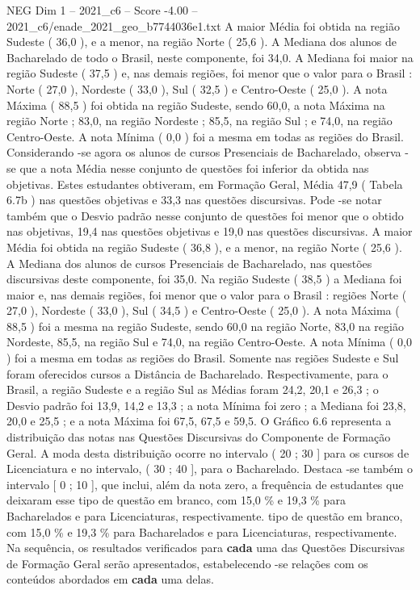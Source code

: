 \begin{textsample}{NEG Dim 1 – 2021\_c6 – Score -4.00 – 2021\_c6/enade\_2021\_geo\_b7744036e1.txt}
A maior Média foi obtida na região Sudeste ( 36,0 ), e a menor, na região Norte ( 25,6 ).
A Mediana dos alunos de Bacharelado de todo o Brasil, neste componente, foi 34,0.
A Mediana foi maior na região Sudeste ( 37,5 ) e, nas demais regiões, foi menor que o valor para o Brasil : Norte ( 27,0 ), Nordeste ( 33,0 ), Sul ( 32,5 ) e Centro-Oeste ( 25,0 ).
A nota Máxima ( 88,5 ) foi obtida na região Sudeste, sendo 60,0, a nota Máxima na região Norte ; 83,0, na região Nordeste ; 85,5, na região Sul ; e 74,0, na região Centro-Oeste.
A nota Mínima ( 0,0 ) foi a mesma em todas as regiões do Brasil.
Considerando -se agora os alunos de cursos Presenciais de Bacharelado, observa -se que a nota Média nesse conjunto de questões foi inferior da obtida nas objetivas.
Estes estudantes obtiveram, em Formação Geral, Média 47,9 ( Tabela 6.7b ) nas questões objetivas e 33,3 nas questões discursivas.
Pode -se notar também que o Desvio padrão nesse conjunto de questões foi menor que o obtido nas objetivas, 19,4 nas questões objetivas e 19,0 nas questões discursivas.
A maior Média foi obtida na região Sudeste ( 36,8 ), e a menor, na região Norte ( 25,6 ).
A Mediana dos alunos de cursos Presenciais de Bacharelado, nas questões discursivas deste componente, foi 35,0.
Na região Sudeste ( 38,5 ) a Mediana foi maior e, nas demais regiões, foi menor que o valor para o Brasil : regiões Norte ( 27,0 ), Nordeste ( 33,0 ), Sul ( 34,5 ) e Centro-Oeste ( 25,0 ).
A nota Máxima ( 88,5 ) foi a mesma na região Sudeste, sendo 60,0 na região Norte, 83,0 na região Nordeste, 85,5, na região Sul e 74,0, na região Centro-Oeste.
A nota Mínima ( 0,0 ) foi a mesma em todas as regiões do Brasil.
Somente nas regiões Sudeste e Sul foram oferecidos cursos a Distância de Bacharelado.
Respectivamente, para o Brasil, a região Sudeste e a região Sul as Médias foram 24,2, 20,1 e 26,3 ; o Desvio padrão foi 13,9, 14,2 e 13,3 ; a nota Mínima foi zero ; a Mediana foi 23,8, 20,0 e 25,5 ; e a nota Máxima foi 67,5, 67,5 e 59,5.
O Gráfico 6.6 representa a distribuição das notas nas Questões Discursivas do Componente de Formação Geral.
A moda desta distribuição ocorre no intervalo ( 20 ; 30 ] para os cursos de Licenciatura e no intervalo, ( 30 ; 40 ], para o Bacharelado.
Destaca -se também o intervalo [ 0 ; 10 ], que inclui, além da nota zero, a frequência de estudantes que deixaram esse tipo de questão em branco, com 15,0 \% e 19,3 \% para Bacharelados e para Licenciaturas, respectivamente. tipo de questão em branco, com 15,0 \% e 19,3 \% para Bacharelados e para Licenciaturas, respectivamente.
Na sequência, os resultados verificados para \textbf{cada} uma das Questões Discursivas de Formação Geral serão apresentados, estabelecendo -se relações com os conteúdos abordados em \textbf{cada} uma delas.

\end{textsample}

